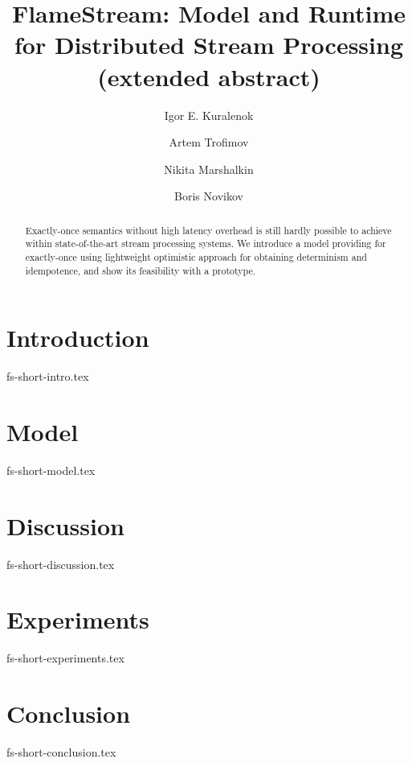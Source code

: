\documentclass[sigconf]{acmart}
\theoremstyle{remark}
\newcommand {\FlameStream} {FlameStream}
\begin{document}

\title {\FlameStream: Model and Runtime for Distributed Stream Processing (extended abstract)}

\author{Igor E. Kuralenok}

\author{Artem Trofimov}

\author{Nikita Marshalkin}

\author{Boris Novikov}

\begin{abstract}
Exactly-once semantics without high latency overhead is still hardly  possible to achieve within state-of-the-art stream processing systems. We introduce  a model   providing  for exactly-once using lightweight optimistic approach for obtaining determinism and idempotence, and show its feasibility with a prototype.
\end {abstract}

\maketitle

\section {Introduction}
 {fs-short-intro.tex}

\section {Model}
 {fs-short-model.tex}

\section {Discussion}
 {fs-short-discussion.tex}

\section {Experiments}
 {fs-short-experiments.tex}

\section {Conclusion}
 {fs-short-conclusion.tex}



\end{document}
